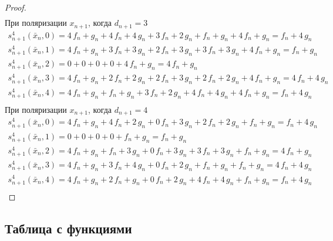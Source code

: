 \documentclass[a4paper, 12pt]{article}
\begin{document}
\begin{proof}
$$\begin{array}{l}
\end{array}$$
При поляризации $x_{n+1}$, когда $d_{n+1} = 3$
$$\begin{array}{l}
s_{n+1}^4(\bar{x}_n, 0) = 4\,f_n + g_n + 4\,f_n + 4\,g_n + 3\,f_n + 2\,g_n + f_n + g_n + 4\,f_n + g_n = f_n + 4\,g_n \\
s_{n+1}^4(\bar{x}_n, 1) = 4\,f_n + g_n + 3\,f_n + 3\,g_n + 2\,f_n + 3\,g_n + 3\,f_n + 3\,g_n + 4\,f_n + g_n = f_n + g_n \\
s_{n+1}^4(\bar{x}_n, 2) = 0 + 0 + 0 + 0 + 4\,f_n + g_n = 4\,f_n + g_n \\
s_{n+1}^4(\bar{x}_n, 3) = 4\,f_n + g_n + 2\,f_n + 2\,g_n + 2\,f_n + 3\,g_n + 2\,f_n + 2\,g_n + 4\,f_n + g_n = 4\,f_n + 4\,g_n \\
s_{n+1}^4(\bar{x}_n, 4) = 4\,f_n + g_n + f_n + g_n + 3\,f_n + 2\,g_n + 4\,f_n + 4\,g_n + 4\,f_n + g_n = f_n + 4\,g_n \\
\end{array}$$
При поляризации $x_{n+1}$, когда $d_{n+1} = 4$
$$\begin{array}{l}
s_{n+1}^4(\bar{x}_n, 0) = 4\,f_n + g_n + 4\,f_n + 2\,g_n + 0\,f_n + 3\,g_n + 2\,f_n + 2\,g_n + f_n + g_n = f_n + 4\,g_n \\
s_{n+1}^4(\bar{x}_n, 1) = 0 + 0 + 0 + 0 + f_n + g_n = f_n + g_n \\
s_{n+1}^4(\bar{x}_n, 2) = 4\,f_n + g_n + f_n + 3\,g_n + 0\,f_n + 3\,g_n + 3\,f_n + 3\,g_n + f_n + g_n = 4\,f_n + g_n \\
s_{n+1}^4(\bar{x}_n, 3) = 4\,f_n + g_n + 3\,f_n + 4\,g_n + 0\,f_n + 2\,g_n + f_n + g_n + f_n + g_n = 4\,f_n + 4\,g_n \\
s_{n+1}^4(\bar{x}_n, 4) = 4\,f_n + g_n + 2\,f_n + g_n + 0\,f_n + 2\,g_n + 4\,f_n + 4\,g_n + f_n + g_n = f_n + 4\,g_n \\
\end{array}$$

\end{proof}

\subsection{Таблица с функциями}
\end{document}
